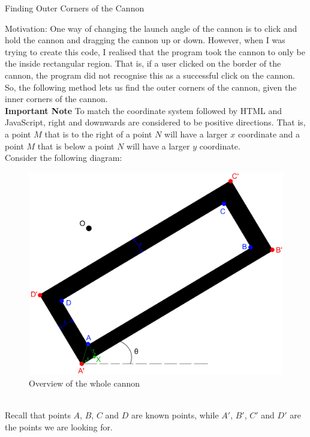 \documentclass{article}
\begin{document}
\begin{center} \huge Finding Outer Corners of the Cannon \\
\end{center}
Motivation: One way of changing the launch angle of the cannon is to click and hold the cannon and dragging the cannon up or down. However, when I was trying to create this code, I realised that the program took the cannon to only be the inside rectangular region. That is, if a user clicked on the border of the cannon, the program did not recognise this as a successful click on the cannon. So, the following method lets us find the outer corners of the cannon, given the inner corners of the cannon. \vspace{\baselineskip}\\
\textbf{Important Note}
\indent To match the coordinate system followed by HTML and JavaScript, right and downwards are considered to be positive directions. That is, a point $M$ that is to the right of a point $N$ will have a larger $x$ coordinate and a point $M$ that is below a point $N$ will have a larger $y$ coordinate.\vspace{\baselineskip}\\
Consider the following diagram:\\
\begin{figure}[h]
	\centering
	\includegraphics[scale=0.08]{FindingOuterCornersOfCannon_1.png}
	\caption{Overview of the whole cannon}
\end{figure}\\
Recall that points $A$, $B$, $C$ and $D$ are known points, while $A'$, $B'$, $C'$ and $D'$ are the points we are looking for.\vspace{\baselineskip}\\
\end{document}
